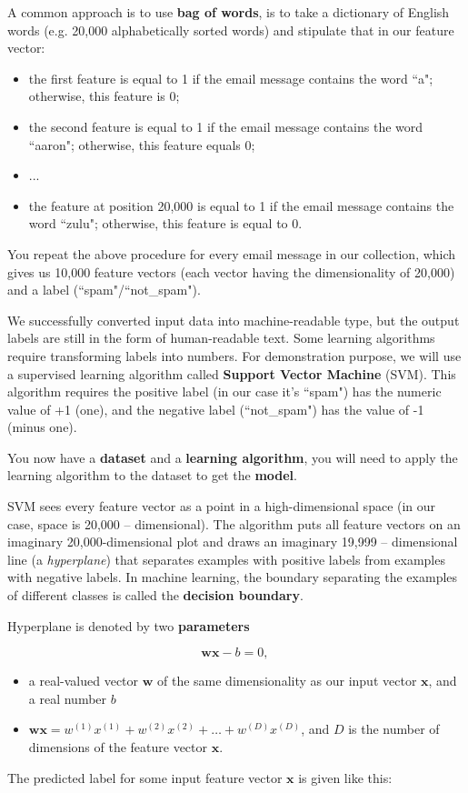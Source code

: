 A common approach is to use \textbf{bag of words}, is to take a dictionary of English words (e.g. 20,000 alphabetically sorted words) and stipulate that in our feature vector:
\begin{itemize}
	\item the first feature is equal to 1 if the email message contains the word ``a"; otherwise, this feature is 0;
	\item the second feature is equal to 1 if the email message contains the word ``aaron"; otherwise, this feature equals 0;
	\item ...
	\item the feature at position 20,000 is equal to 1 if the email message contains the word ``zulu"; otherwise, this feature is equal to 0.
\end{itemize}
You repeat the above procedure for every email message in our collection, which gives us 10,000 feature vectors (each vector having the dimensionality of 20,000) and a label (``spam"/``not\_spam").

We successfully converted input data into machine-readable type, but the output labels are still in the form of human-readable text. Some learning algorithms require transforming labels into numbers. For demonstration purpose, we will use a supervised learning algorithm called \textbf{Support Vector Machine} (SVM). This algorithm requires the positive label (in our case it's ``spam") has the numeric value of +1 (one), and the negative label (``not\_spam") has the value of -1 (minus one).

You now have a \textbf{dataset} and a \textbf{learning algorithm}, you will need to apply the learning algorithm to the dataset to get the \textbf{model}.

SVM sees every feature vector as a point in a high-dimensional space (in our case, space is 20,000 -- dimensional). The algorithm puts all feature vectors on an imaginary 20,000-dimensional plot and draws an imaginary 19,999 -- dimensional line (a \textit{hyperplane}) that separates examples with positive labels from examples with negative labels. In machine learning, the boundary separating the examples of different classes is called the \textbf{decision boundary}.

Hyperplane is denoted by two \textbf{parameters}

\[ \mathbf{w} \mathbf{x}-b=0 \text {, } \]
\begin{itemize}
	\item a real-valued vector $\mathbf{w}$ of the same dimensionality as our input vector $\mathbf{x}$, and a real number $b$
	\item $\mathbf{w} \mathbf{x}= w^{(1)} x^{(1)}+w^{(2)} x^{(2)}+\ldots+w^{(D)} x^{(D)}$, and $D$ is the number of dimensions of the feature vector $\mathbf{x}$.
\end{itemize}
The predicted label for some input feature vector $\mathbf{x}$ is given like this:

